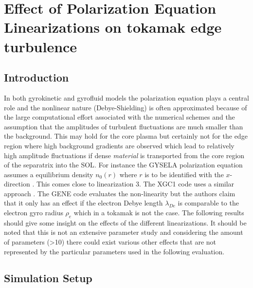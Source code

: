 \documentclass[master.tex]{subfiles}
\begin{document}
\chapter{Effect of Polarization Equation Linearizations on tokamak edge turbulence}\label{sec:polarization_equation_evaluation}

\section{Introduction}
In both gyrokinetic and gyrofluid models the polarization equation plays a central role and the nonlinear nature (Debye-Shielding) is often approximated because of the large computational effort associated with the numerical schemes and the assumption that the amplitudes of turbulent fluctuations are much smaller than the background. This may hold for the core plasma but certainly not for the edge region where high background gradients are observed which lead to relatively high amplitude fluctuations if dense \textit{material} is transported from the core region of the separatrix into the \ac{SOL}. For instance the GYSELA polarization equation assumes a equilibrium density $n_0(r)$ where $r$ is to be identified with the $x$-direction \cite{GYSELACODE}. This comes close to linearization 3. The XGC1 code uses a similar approach \cite{XGC1Code}. The GENE code evaluates the non-linearity but the authors claim that it only has an effect if the electron Debye length $\lambda_{De}$ is comparable to the electron gyro radius $\rho_e$ which in a tokamak is not the case. The following results should give some insight on the effects of the different linearizations. It should be noted that this is not an extensive parameter study and considering the amount of parameters (>10) there could exist various other effects that are not represented by the particular parameters used in the following evaluation.

\section{Simulation Setup}
\end{document}
